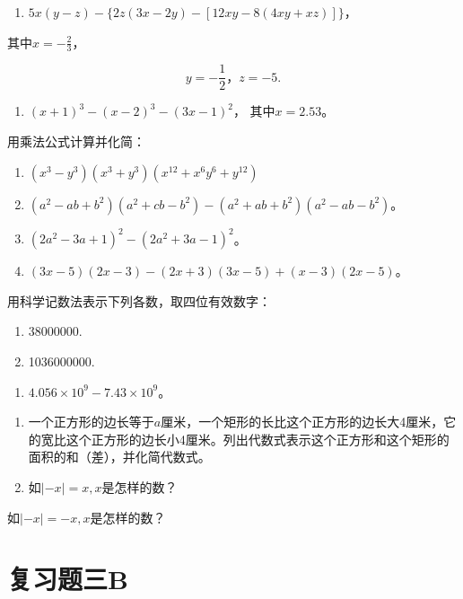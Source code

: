 \begin{enumerate}[start=20]
\item
  \(5x(y - z) - \{2z(3x - 2y) - [12xy - 8(4xy + xz)]\}\)，
\end{enumerate}
其中\(x = -\frac{2}{3}\)，

\[
y = - \frac{1}{2}\text{，} z = - 5.
\]

\begin{enumerate}[start=21]
\item
  \((x + 1)^{3} - (x - 2)^{3} - (3x - 1)^{2}\)， 其中\(x = 2.53\)。
\end{enumerate}

用乘法公式计算并化简：

\begin{enumerate}[start=22]
\item
  \((x^{3} - y^{3})(x^{3} + y^{3})(x^{12} + x^{6}y^{6} + y^{12})\)
\item
  \((a^2 - ab + b^2)(a^2 + cb - b^2) - (a^2 + ab + b^2)(a^2 - ab - b^2)\)。
\item
  \((2a^{2} - 3a + 1)^{2} - (2a^{2} + 3a - 1)^{2}\)。
\item
  \((3x - 5)(2x - 3) - (2x + 3)(3x - 5) + (x - 3)(2x - 5)\)。
\end{enumerate}

用科学记数法表示下列各数，取四位有效数字：

\begin{enumerate}[start=26]
\item
  38000000.
\item
  1036000000.
\end{enumerate}

\begin{enumerate}[start=28]
\item
  \(4.056 \times 10^{9} - 7.43 \times 10^{9}\)。
\end{enumerate}

\begin{enumerate}[start=29]
\item
  一个正方形的边长等于\(a\)厘米，一个矩形的长比这个正方形的边长大4厘米，它的宽比这个正方形的边长小4厘米。列出代数式表示这个正方形和这个矩形的面积的和（差），并化简代数式。
\item
  如\(|-x|=x, x\)是怎样的数？
\end{enumerate}

如\(|-x|=-x,x\)是怎样的数？

\section{复习题三B}

